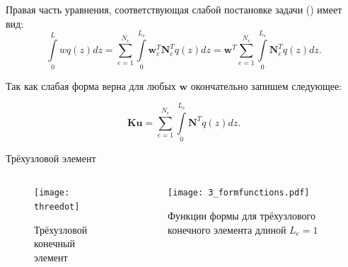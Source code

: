 \documentclass[7pt]{beamer}
\numberwithin{equation}{section}
\begin{document}
\begin{frame}
	Правая часть уравнения, соответствующая слабой постановке задачи () имеет вид:
	\[
		\int\limits_{0}^{L}wq(z)dz=\sum\limits_{e=1}^{N_e}\int\limits_{0}^{L_e}\textbf{w}_e^{T}\textbf{N}^T_e q(z)dz=\textbf{w}^{T}\sum\limits_{e=1}^{N_e} \int\limits_{0}^{L_e}\textbf{N}_e^{T}q(z)dz.
		\]

	Так как слабая форма верна для любых $\textbf{w}$  окончательно запишем следующее:
	\begin{block}{}
		\[\textbf{Ku}=\sum\limits_{e=1}^{N_e}\int\limits_{0}^{L_e}\textbf{N}^{T}q(z)dz.\]
	\end{block}
\end{frame}

\begin{frame}{Трёхузловой элемент}
	\begin{columns}
		\begin{column}{0.58\textwidth}
			\begin{figure}[H]
				\centering
				\texttt{[image: threedot]}
				\caption{Трёхузловой конечный элемент}
				\label{fig:threedot}
			\end{figure}
		\end{column}
		\begin{column}{0.58\textwidth}
			\begin{figure}[H]
				\centering
				\texttt{[image: 3\_formfunctions.pdf]}
				\caption{Функции формы для трёхузлового конечного элемента длиной $L_{e}=1$}
				\label{fig:3_formfunctions}
			\end{figure}
		\end{column}
	\end{columns}
\end{frame}
\end{document}
